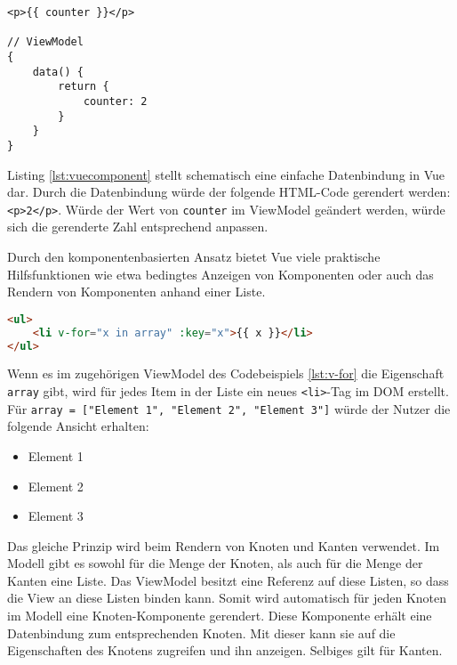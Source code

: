 \bigskip

\begin{lstlisting}[caption=Datenbindung in Vue, label=lst:vuecomponent]
<p>{{ counter }}</p>

// ViewModel
{
    data() {
        return {
            counter: 2
        }
    }
}
\end{lstlisting}

Listing \ref{lst:vuecomponent} stellt schematisch eine einfache Datenbindung in Vue dar. Durch die Datenbindung würde der folgende HTML-Code gerendert werden: \texttt{<p>2</p>}. Würde der Wert von \texttt{counter} im ViewModel geändert werden, würde sich die gerenderte Zahl entsprechend anpassen.

Durch den komponentenbasierten Ansatz bietet Vue viele praktische Hilfsfunktionen wie etwa bedingtes Anzeigen von Komponenten oder auch das Rendern von Komponenten anhand einer Liste.

\begin{lstlisting}[caption=Rendern von Listen in Vue, label=lst:v-for,language=HTML]
<ul>
    <li v-for="x in array" :key="x">{{ x }}</li>
</ul>
\end{lstlisting}

Wenn es im zugehörigen ViewModel des Codebeispiels \ref{lst:v-for} die Eigenschaft \texttt{array} gibt, wird für jedes Item in der Liste ein neues \texttt{<li>}-Tag im \ac{DOM} erstellt. Für \texttt{array = ["{}Element 1"{}, "{}Element 2"{}, "{}Element 3"{}]} würde der Nutzer die folgende Ansicht erhalten:
\begin{itemize}
    \item Element 1
    \item Element 2
    \item Element 3
\end{itemize}

Das gleiche Prinzip wird beim Rendern von Knoten und Kanten verwendet. Im Modell gibt es sowohl für die Menge der Knoten, als auch für die Menge der Kanten eine Liste. Das ViewModel besitzt eine Referenz auf diese Listen, so dass die View an diese Listen binden kann. Somit wird automatisch für jeden Knoten im Modell eine Knoten-Komponente gerendert. Diese Komponente erhält eine Datenbindung zum entsprechenden Knoten. Mit dieser kann sie auf die Eigenschaften des Knotens zugreifen und ihn anzeigen. Selbiges gilt für Kanten.
